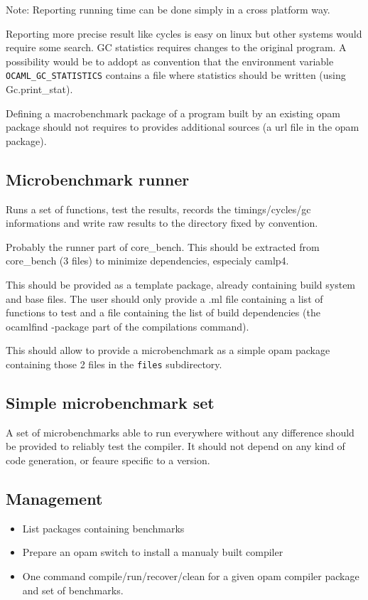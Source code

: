 \documentclass[11pt,a4paper]{article}
\begin{document}
Note: Reporting running time can be done simply in a cross platform
way.

Reporting more precise result like cycles is easy on linux but
other systems would require some search. GC statistics requires
changes to the original program. A possibility would be to addopt as
convention that the environment variable
\texttt{OCAML\_GC\_STATISTICS} contains a file where statistics should
be written (using Gc.print\_stat).

Defining a macrobenchmark package of a program built by an existing
opam package should not requires to provides additional sources (a
url file in the opam package).

\subsection{Microbenchmark runner}

Runs a set of functions, test the results, records the
timings/cycles/gc informations and write raw results to the directory
fixed by convention.

Probably the runner part of core\_bench. This should be extracted from
core\_bench (3 files) to minimize dependencies, especialy camlp4.

This should be provided as a template package, already containing
build system and base files. The user should only provide a .ml file
containing a list of functions to test and a file containing the list
of build dependencies (the ocamlfind -package part of the compilations
command).

This should allow to provide a microbenchmark as a simple opam package
containing those 2 files in the \texttt{files} subdirectory.

\subsection{Simple microbenchmark set}

A set of microbenchmarks able to run everywhere without any difference
should be provided to reliably test the compiler. It should not depend
on any kind of code generation, or feaure specific to a version.

\subsection{Management}

\begin{itemize}
\item List packages containing benchmarks
\item Prepare an opam switch to install a manualy built compiler
\item One command compile/run/recover/clean for a given opam compiler
  package and set of benchmarks.
\end{itemize}
\end{document}
